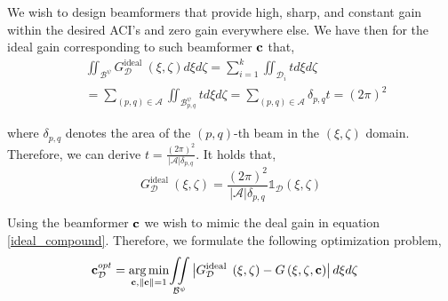 We wish to design beamformers that provide high, sharp, and constant gain within the desired ACI's and zero gain everywhere else. We have then for the ideal gain corresponding to such beamformer ${\bf{c}}$ that,
\begin{align}
&\iint_{\mathcal{B}^{\psi}} G^\text {ideal }_{\mathcal{D}}(\xi, \zeta) d \xi d \zeta =\sum_{i=1}^k\iint_{\mathcal{D}_i} t d \xi d \zeta \nonumber\\
&= \sum_{(p,q) \in \mathcal{A} }{\iint_{\mathcal{B}^\psi_{p,q}} t d \xi d \zeta} = \sum_{(p,q) \in \mathcal{A}}\delta_{p,q} t=(2 \pi)^2 \label{composite}
\end{align}

where $\delta_{p,q}$ denotes the area of the $(p,q)$-th beam in the $(\xi, \zeta)$ domain. Therefore, we can derive $t= \frac{(2\pi)^2}{|\mathcal{A}|\delta_{p,q}}$. It holds that, 
\begin{equation}
    G^{\text {ideal }}_{ \mathcal{D}}\left(\xi, \zeta\right)=\frac{(2\pi)^2}{|\mathcal{A}|\delta_{p,q}} \mathds{1}_{\mathcal{D}}\left(\xi, \zeta\right)\label{ideal_compound}
\end{equation}

Using the beamformer ${\bf{c}}$ we wish to mimic the deal gain in equation \eqref{ideal_compound}. Therefore, we formulate the following optimization problem, 
\begin{align}
& {\bf{c}}^{opt}_{\mathcal{D}} = \underset{{\bf{c}}, \|{\bf{c}}\|=1}{\arg \min } \underset{\mathcal{B}^{\psi}}{\iint}\left|G^{\text {ideal }}_{\mathcal{D}}\left(\xi, \zeta\right)-G\left(\xi, \zeta, {\bf{c}}\right)\right| d \xi d \zeta \label{init_opt}
\end{align}

